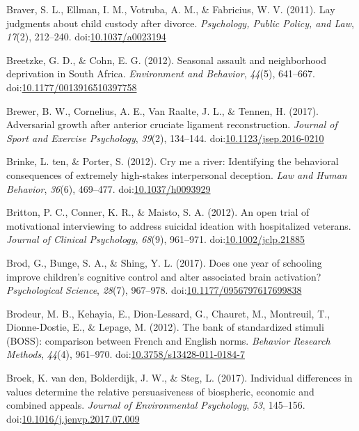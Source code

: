 \documentclass[english,man]{apa6}
\begin{document}
\hypertarget{ref-Braver2011}{}
Braver, S. L., Ellman, I. M., Votruba, A. M., \& Fabricius, W. V.
(2011). Lay judgments about child custody after divorce.
\emph{Psychology, Public Policy, and Law}, \emph{17}(2), 212--240.
doi:\href{https://doi.org/10.1037/a0023194}{10.1037/a0023194}

\hypertarget{ref-Breetzke2012}{}
Breetzke, G. D., \& Cohn, E. G. (2012). Seasonal assault and
neighborhood deprivation in South Africa. \emph{Environment and
Behavior}, \emph{44}(5), 641--667.
doi:\href{https://doi.org/10.1177/0013916510397758}{10.1177/0013916510397758}

\hypertarget{ref-Brewer2017}{}
Brewer, B. W., Cornelius, A. E., Van Raalte, J. L., \& Tennen, H.
(2017). Adversarial growth after anterior cruciate ligament
reconstruction. \emph{Journal of Sport and Exercise Psychology},
\emph{39}(2), 134--144.
doi:\href{https://doi.org/10.1123/jsep.2016-0210}{10.1123/jsep.2016-0210}

\hypertarget{ref-TenBrinke2012}{}
Brinke, L. ten, \& Porter, S. (2012). Cry me a river: Identifying the
behavioral consequences of extremely high-stakes interpersonal
deception. \emph{Law and Human Behavior}, \emph{36}(6), 469--477.
doi:\href{https://doi.org/10.1037/h0093929}{10.1037/h0093929}

\hypertarget{ref-Britton2012}{}
Britton, P. C., Conner, K. R., \& Maisto, S. A. (2012). An open trial of
motivational interviewing to address suicidal ideation with hospitalized
veterans. \emph{Journal of Clinical Psychology}, \emph{68}(9), 961--971.
doi:\href{https://doi.org/10.1002/jclp.21885}{10.1002/jclp.21885}

\hypertarget{ref-Brod2017}{}
Brod, G., Bunge, S. A., \& Shing, Y. L. (2017). Does one year of
schooling improve children's cognitive control and alter associated
brain activation? \emph{Psychological Science}, \emph{28}(7), 967--978.
doi:\href{https://doi.org/10.1177/0956797617699838}{10.1177/0956797617699838}

\hypertarget{ref-Brodeur2012}{}
Brodeur, M. B., Kehayia, E., Dion-Lessard, G., Chauret, M., Montreuil,
T., Dionne-Dostie, E., \& Lepage, M. (2012). The bank of standardized
stimuli (BOSS): comparison between French and English norms.
\emph{Behavior Research Methods}, \emph{44}(4), 961--970.
doi:\href{https://doi.org/10.3758/s13428-011-0184-7}{10.3758/s13428-011-0184-7}

\hypertarget{ref-VandenBroek2017}{}
Broek, K. van den, Bolderdijk, J. W., \& Steg, L. (2017). Individual
differences in values determine the relative persuasiveness of
biospheric, economic and combined appeals. \emph{Journal of
Environmental Psychology}, \emph{53}, 145--156.
doi:\href{https://doi.org/10.1016/j.jenvp.2017.07.009}{10.1016/j.jenvp.2017.07.009}
\end{document}
